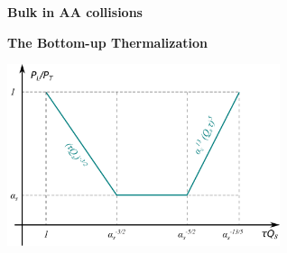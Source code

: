 \documentclass[9pt,a4paper,unknownkeysallowed,xcolor=dvipsnames,aspectratio=43]{beamer}
\begin{document}
%
\setcounter{page}{0}
\begin{frame}
\vspace*{\fill}
\begin{center}
{\Huge\bf\color{gray} Bulk in AA collisions}
\end{center}
\vspace*{\fill}
\end{frame}
%
%
\setcounter{page}{7}
\begin{frame}{\bf\huge The Bottom-up Thermalization}	\vspace{2mm}
\begin{center}
\includegraphics[width=0.6\textwidth]{fig/PLoPT}\\
\vspace{4mm}

\end{center}
\end{frame}
\end{document}
